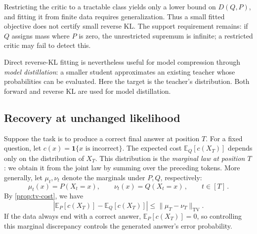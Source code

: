 \documentclass[11pt,twoside]{article}
\newcommand{\E}{\mathbb E}
\newcommand{\KL}{D}
\newcommand{\tv}[1]{\lVert #1\rVert_{\mathrm{TV}}}
\theoremstyle{definition}
\theoremstyle{remark}
\begin{document}
Restricting the critic to a tractable class yields only a lower bound
on \(\KL(Q,P)\), and fitting it from finite data requires generalization.
Thus a small fitted objective does not certify small reverse KL.
The support requirement remains: if \(Q\) assigns mass where \(P\) is
zero, the unrestricted supremum is infinite; a restricted critic may
fail to detect this.

Direct reverse-KL fitting is nevertheless useful for model compression
through \emph{model distillation}: a smaller student approximates an
existing teacher whose probabilities can be evaluated.
Here the target is the teacher's distribution. Both forward and reverse
KL are used for model distillation.\label{en:distillation}

\subsection{Recovery at unchanged likelihood}
\label{sec:stability}

Suppose the task is to produce a correct final answer at position \(T\).
For a fixed question, let \(c(x)=\mathbf 1\{x\text{ is incorrect}\}\).
The expected cost
\(\E_Q[c(X_T)]\) depends only on the distribution of \(X_T\).
This distribution is the \emph{marginal law at position \(T\)}:
we obtain it from the joint law by summing over the preceding tokens.
More generally,
let \(\mu_t,\nu_t\) denote the marginals under \(P,Q\), respectively:
\[
\mu_t(x)=P(X_t=x),\qquad \nu_t(x)=Q(X_t=x)\,, \qquad t\in [T]\,.
\]
By \cref{prop:tv-cost}, we have
\[
 \left|\E_P[c(X_T)]-\E_Q[c(X_T)]\right|
 \le\tv{\mu_T-\nu_T}.
\]
If the data always end with a correct answer, \(\E_P[c(X_T)]=0\),
so controlling this marginal discrepancy controls the generated
answer's error probability.
\end{document}
